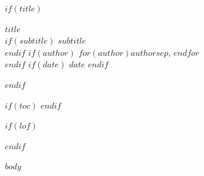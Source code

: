 \documentclass[
  paper=a4,
  fontsize=11pt,
  parskip=half,
  headings=big
]{scrartcl}
\begin{document}
$if(title)$
\begin{center}
{\huge \bfseries \sffamily $title$} \\[1em]
$if(subtitle)$
{\Large \sffamily $subtitle$} \\[1em]
$endif$
$if(author)$
{\large $for(author)$$author$$sep$, $endfor$} \\
$endif$
$if(date)$
{\large $date$}
$endif$
\end{center}
\vspace{2em}
$endif$

$if(toc)$
{
\hypersetup{linkcolor=black}
\setcounter{tocdepth}{$toc-depth$}
\tableofcontents
\newpage
}
$endif$

$if(lof)$
{
\hypersetup{linkcolor=black}
\listoffigures
\newpage
}
$endif$

$body$
\end{document}
